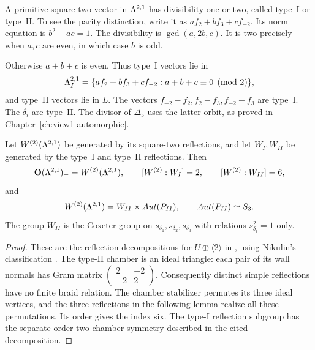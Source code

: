 \begin{remark}
\label{rem:bkm-divisibility-types}
A primitive square-two vector in $\Lambda^{2,1}$ has divisibility one
or two, called type~I or type~II. To see the parity distinction,
write it as $af_2+bf_3+cf_{-2}$. Its norm equation is $b^2-ac=1$.
The divisibility is $\gcd(a,2b,c)$. It is two precisely when $a,c$
are even, in which case $b$ is odd.

Otherwise $a+b+c$ is even.
Thus type~I vectors lie in
\[
 \Lambda^{2,1}_I=\{af_2+bf_3+cf_{-2}:a+b+c\equiv0\pmod2\},
\]
and type~II vectors lie in $L$. The vectors
$f_{-2}-f_2,f_2-f_3,f_{-2}-f_3$ are type~I. The $\delta_i$ are
type~II. The divisor of $\Delta_5$ uses the latter orbit, as proved
in Chapter~\ref{ch:view1-automorphic}.
\end{remark}

\begin{lemma}
\label{lem:bkm-reflection-decomposition}
Let $W^{(2)}(\Lambda^{2,1})$ be generated by its square-two reflections,
and let $W_I,W_{II}$ be generated by the type~I and type~II
reflections. Then
\begin{equation}
\label{eq:bkm-reflection-indices}
 \mathbf{O}(\Lambda^{2,1})_+=W^{(2)}(\Lambda^{2,1}),\qquad
 [W^{(2)}:W_I]=2,\qquad [W^{(2)}:W_{II}]=6,
\end{equation}
and
\begin{equation}
\label{eq:bkm-chamber-decomposition}
 W^{(2)}(\Lambda^{2,1})=W_{II}\rtimes Aut(P_{II}),\qquad
 Aut(P_{II})\simeq S_3.
\end{equation}
The group $W_{II}$ is the Coxeter group on $s_{\delta_1},s_{\delta_2},
s_{\delta_3}$ with relations $s_{\delta_i}^2=1$ only.
\end{lemma}
\begin{proof}
These are the reflection decompositions for $U\oplus\langle2\rangle$
in \cite[Section~2, equations~(2.1)--(2.3)]{GN}, using Nikulin's
classification \cite{NIKULIN}. The type-II chamber is an ideal
triangle: each pair of its wall normals has Gram matrix
$\left(\begin{smallmatrix}2&-2\\-2&2\end{smallmatrix}\right)$.
Consequently distinct simple reflections have no finite braid
relation. The chamber stabilizer permutes its three ideal vertices,
and the three reflections in the following lemma realize all these
permutations. Its order gives the index six. The type-I reflection
subgroup has the separate order-two chamber symmetry described in
the cited decomposition.
\end{proof}


